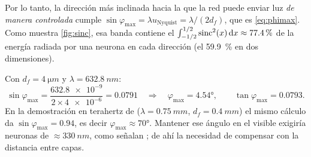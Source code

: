 Por lo tanto, la dirección más inclinada hacia la que la red puede enviar luz \emph{de
manera controlada} cumple $\sin\varphi_{\max}=\lambda u_{\text{Nyquist}}=\lambda/(2d_f)$, que es
\eqref{eq:phimax}. Como muestra \cref{fig:sinc}, esa banda contiene el
$\int_{-1/2}^{1/2}\operatorname{sinc}^2(x)\,\mathrm{d} x\approx\SI{77.4}{\percent}$ de la energía radiada por una
neurona en cada dirección (el \SI{59.9}{\percent} en dos dimensiones).

\begin{calculo}
Con $d_f=\SI{4}{\micro m}$ y $\lambda=\SI{632.8}{nm}$:
\[
  \sin\varphi_{\max}=\frac{\num{632.8e-9}}{2\times\num{4e-6}}=\num{0.0791}
  \quad\Rightarrow\quad\varphi_{\max}=\ang{4.54},
  \qquad\tan\varphi_{\max}=\num{0.0793}.
\]
En la demostración en terahertz de \textcite{lin2018} ($\lambda=\SI{0.75}{mm}$,
$d_f=\SI{0.4}{mm}$) el mismo cálculo da $\sin\varphi_{\max}=0.94$, es decir $\varphi_{\max}\approx\ang{70}$.
Mantener ese ángulo en el visible exigiría neuronas de $\approx\SI{330}{nm}$, como señalan
\textcite{chen2021}; de ahí la necesidad de compensar con la distancia entre capas.
\end{calculo}
